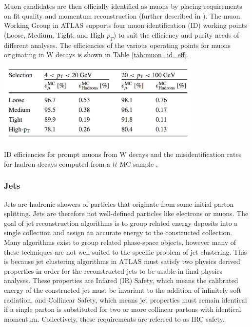 Muon candidates are then officially identified as muons by placing requirements on fit quality and momentum reconstruction (further described in \cite{muons_run2}). The muon Working Group in ATLAS supports four muon identification (ID) working points (Loose, Medium, Tight, and High $p_T$) to suit the efficiency and purity needs of different analyses. The efficiencies of the various operating points for muons originating in W decays is shown in Table \ref{tab:muon_id_eff}.\\

\begin{table}[htb!]
    \centering
    \includegraphics[width=4in]{figures/chapter3/muon_id_eff.png}
    \caption{ID efficiencies for prompt muons from W decays and the misidentification rates for hadron decays computed from a $t\bar{t}$ MC sample \cite{muons_run2}.}
    \label{tab:muon_id_eff}
\end{table}

\subsubsection{Jets}
Jets are hadronic showers of particles that originate from some initial parton splitting. Jets are therefore not well-defined particles like electrons or muons. The goal of jet reconstruction algorithms is to group related energy deposits into a single collection and assign an accurate energy to the constructed collection.\\

Many algorithms exist to group related phase-space objects, however many of these techniques are not well suited to the specific problem of jet clustering. This is because jet clustering algorithms in ATLAS must satisfy two physics derived properties in order for the reconstructed jets to be usable in final physics analyses. These properties are Infared (IR) Safety, which means the calibrated energy of the constructed jet must be invariant to the addition of infinitely soft radiation, and Collinear Safety, which means jet properties must remain identical if a single parton is substituted for two or more collinear partons with identical momentum. Collectively, these requirements are referred to as IRC safety.\\

